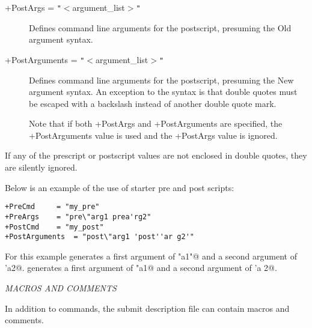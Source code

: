 \begin{description}
\label{man-condor-submit-postargs}
\item[+PostArgs = \texttt{"}$<$argument\_list$>$\texttt{"}]
Defines command line arguments for the postscript, 
presuming the Old argument syntax.

\label{man-condor-submit-postarguments}
\item[+PostArguments = \texttt{"}$<$argument\_list$>$\texttt{"}]
Defines command line arguments for the postscript, 
presuming the New argument syntax.
An exception to the syntax is that double
quotes must be escaped with a backslash instead of another double
quote mark.

Note that if both +PostArgs and +PostArguments are specified, the
+PostArguments value is used and the +PostArgs value is ignored.

\end{description} 

If any of the prescript or postscript values are not enclosed
in double quotes, they are silently ignored.

Below is an example of the use of starter pre and post scripts:

\begin{verbatim}
+PreCmd		= "my_pre"
+PreArgs	= "pre\"arg1 prea'rg2"
+PostCmd	= "my_post"
+PostArguments	= "post\"arg1 'post''ar g2'"
\end{verbatim}

For this example  generates a first argument of
\verb@pre"a1"@ and a second argument of \verb@pre'a2@.
 generates a first argument of
\verb@post"a1@ and a second argument of \verb@post'a 2@.

\emph{MACROS AND COMMENTS}

\label{macro-in-submit-description-file}
In addition to commands, the submit description file can contain macros
and comments.

